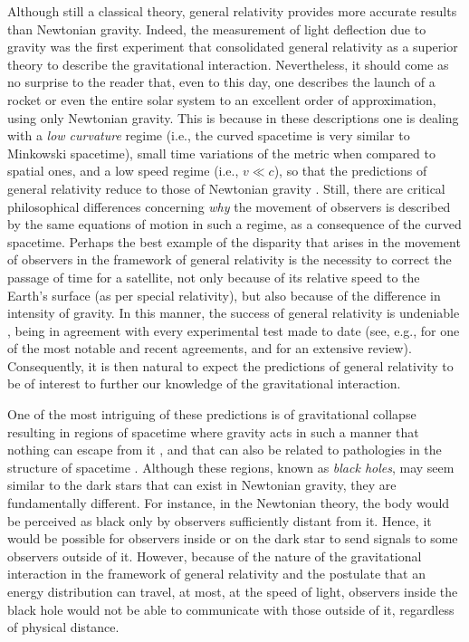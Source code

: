 \documentclass[
12pt,		%
openright,	%
twoside,  %
a4paper,			%
chapter=TITLE,		%
english,			%
french,				%
spanish,			%
brazil				%
]{USPSC-classe/USPSC}
\begin{document}
Although still a classical theory, general relativity provides more accurate results than Newtonian gravity. Indeed, the measurement of light deflection due to gravity \cite{Dyson1920} was the first experiment that consolidated general relativity as a superior theory to describe the gravitational interaction. Nevertheless, it should come as no surprise to the reader that, even to this day, one describes the launch of a rocket or even the entire solar system to an excellent order of approximation, using only Newtonian gravity. This is because in these descriptions one is dealing with a \textit{low curvature} regime (i.e., the curved spacetime is very similar to Minkowski spacetime), small time variations of the metric when compared to spatial ones, and a low speed regime (i.e., $v\ll c$), so that the predictions of general relativity reduce to those of Newtonian gravity \cite{Wald1984}. Still, there are critical philosophical differences concerning \textit{why} the movement of observers is described by the same equations of motion in such a regime, as a consequence of the curved spacetime. Perhaps the best example of the disparity that arises in the movement of observers in the framework of general relativity is the necessity to correct the passage of time for a satellite, not only because of its relative speed to the Earth's surface (as per special relativity), but also because of the difference in intensity of gravity. In this manner, the success of general relativity is undeniable \cite{Misner1973}, being in agreement with every experimental test made to date (see, e.g., \cite{LIGO2016} for one of the most notable and recent agreements, and \cite{Will2018} for an extensive review). Consequently, it is then natural to expect the predictions of general relativity to be of interest to further our knowledge of the gravitational interaction.

One of the most intriguing of these predictions \cite{Oppenheimer1939,Penrose1965, Penrose1969} is of gravitational collapse resulting in regions of spacetime where gravity acts in such a manner that nothing can escape from it \cite{Hawking1972a}, and that can also be related to pathologies in the structure of spacetime \cite{Geroch1968, Hawking1970}. Although these regions, known as \textit{black holes}, may seem similar to the dark stars that can exist in Newtonian gravity, they are fundamentally different. For instance, in the Newtonian theory, the body would be perceived as black only by observers sufficiently distant from it. Hence, it would be possible for observers inside or on the dark star to send signals to some observers outside of it. However, because of the nature of the gravitational interaction in the framework of general relativity and the postulate that an energy distribution can travel, at most, at the speed of light, observers inside the black hole would not be able to communicate with those outside of it, regardless of physical distance.
\end{document}
